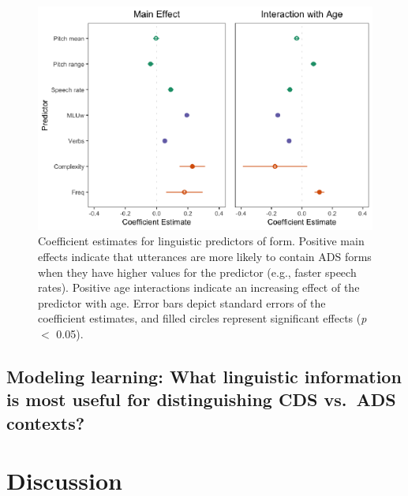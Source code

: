 \documentclass[10pt, letterpaper]{article}
\newenvironment{CodeChunk}{}{}
\begin{document}
\begin{CodeChunk}
\begin{figure}[H]

{\centering \includegraphics{figs/model-plot-1} 

}

\caption[Coefficient estimates for linguistic predictors of form]{Coefficient estimates for linguistic predictors of form. Positive main effects indicate that utterances are more likely to contain ADS forms when they have higher values for the predictor (e.g., faster speech rates). Positive age interactions indicate an increasing effect of the predictor with age. Error bars depict standard errors of the coefficient estimates, and filled circles represent significant effects (\textit{p} $<$ 0.05).}\label{fig:model-plot}
\end{figure}
\end{CodeChunk}

\hypertarget{modeling-learning-what-linguistic-information-is-most-useful-for-distinguishing-cds-vs.-ads-contexts}{%
\subsection{Modeling learning: What linguistic information is most
useful for distinguishing CDS vs.~ADS
contexts?}\label{modeling-learning-what-linguistic-information-is-most-useful-for-distinguishing-cds-vs.-ads-contexts}}

\hypertarget{discussion}{%
\section{Discussion}\label{discussion}}
\end{document}
